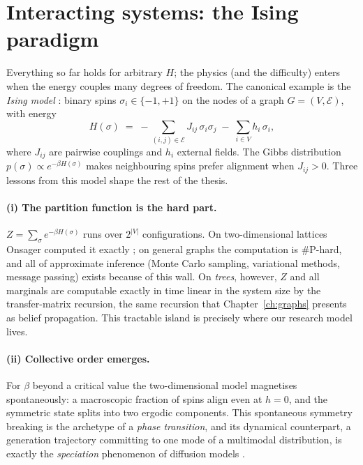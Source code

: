 \section{Interacting systems: the Ising paradigm}\label{sec:ising}

Everything so far holds for arbitrary $H$; the physics (and the
difficulty) enters when the energy couples many degrees of freedom. The
canonical example is the \emph{Ising model} \citep{ising1925beitrag}:
binary spins $\sigma_i \in \{-1, +1\}$ on the nodes of a graph
$G = (V, \mathcal{E})$, with energy
\begin{equation}
  H(\sigma) \;=\; -\sum_{(i,j) \in \mathcal{E}} J_{ij}\, \sigma_i \sigma_j
  \;-\; \sum_{i \in V} h_i\, \sigma_i ,
  \label{eq:ising}
\end{equation}
where $J_{ij}$ are pairwise couplings and $h_i$ external fields. The
Gibbs distribution $p(\sigma) \propto e^{-\beta H(\sigma)}$ makes
neighbouring spins prefer alignment when $J_{ij} > 0$. Three lessons from
this model shape the rest of the thesis.

\paragraph{(i) The partition function is the hard part.}
$Z = \sum_\sigma e^{-\beta H(\sigma)}$ runs over $2^{|V|}$
configurations. On two-dimensional lattices Onsager computed it exactly
\citep{onsager1944crystal}; on general graphs the computation is
\#P-hard, and all of approximate inference (Monte Carlo sampling,
variational methods, message passing) exists because of this wall. On
\emph{trees}, however, $Z$ and all marginals are computable exactly in
time linear in the system size by the transfer-matrix recursion, the same
recursion that Chapter~\ref{ch:graphs} presents as belief propagation.
This tractable island is precisely where our research model lives.

\paragraph{(ii) Collective order emerges.} For $\beta$ beyond a critical
value the two-dimensional model magnetises spontaneously: a macroscopic
fraction of spins align even at $h = 0$, and the symmetric state splits
into two ergodic components. This spontaneous symmetry breaking is the
archetype of a \emph{phase transition}, and its dynamical counterpart, a
generation trajectory committing to one mode of a multimodal
distribution, is exactly the \emph{speciation} phenomenon of diffusion
models \citep{biroli2024dynamical, raya2023spontaneous}.

